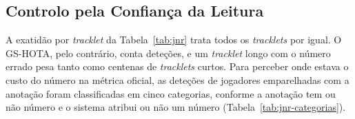 



\subsection{Controlo pela Confiança da Leitura}\label{sec:res_jnr_confianca}

A exatidão por \emph{tracklet} da Tabela~\ref{tab:jnr} trata todos os \emph{tracklets} por igual.
O GS-HOTA, pelo contrário, conta deteções, e um \emph{tracklet} longo com o número errado pesa
tanto como centenas de \emph{tracklets} curtos. Para perceber onde estava o custo do número na
métrica oficial, as deteções de jogadores emparelhadas com a anotação foram classificadas em cinco
categorias, conforme a anotação tem ou não número e o sistema atribui ou não um número
(Tabela~\ref{tab:jnr-categorias}).

